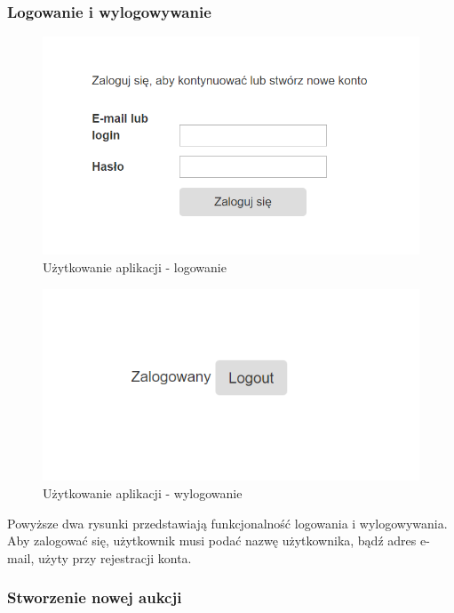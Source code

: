 \documentclass[10pt,titlepage]{article} %
\begin{document}
\subsubsection{Logowanie i wylogowywanie}

\begin{figure}[H]
\includegraphics[width=\textwidth]{img/sekcja4/zaloguj}
\caption[Użytkowanie aplikacji - logowanie]{Użytkowanie aplikacji - logowanie}
\end{figure}

\begin{figure}[H]
\includegraphics[width=\textwidth]{img/sekcja4/wyloguj}
\caption[Użytkowanie aplikacji - wylogowanie]{Użytkowanie aplikacji - wylogowanie}
\end{figure}

Powyższe dwa rysunki przedstawiają funkcjonalność logowania i wylogowywania. Aby zalogować się, użytkownik musi podać nazwę użytkownika, bądź adres e-mail, użyty przy rejestracji konta.

\subsubsection{Stworzenie nowej aukcji}
\end{document}
